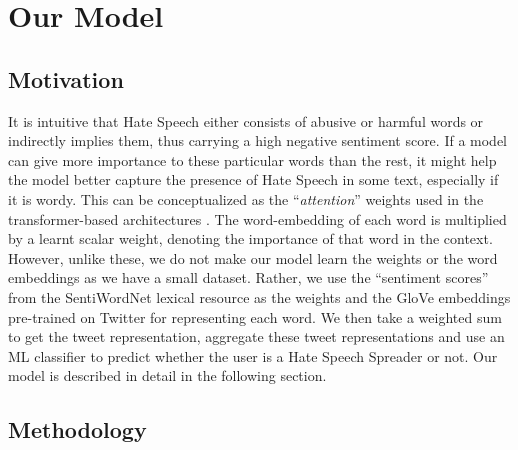 \section{Our Model}
\label{sec:models:our-model}

\subsection{Motivation}
\label{sec:models:our-model:motivation}
It is intuitive that Hate Speech either consists of abusive or harmful words or indirectly implies them, thus carrying a high negative sentiment score. If a model can give more importance to these particular words than the rest, it might help the model better capture the presence of Hate Speech in some text, especially if it is wordy. This can be conceptualized as the ``\textit{attention}''  weights used in the transformer-based architectures \cite{attention}. The word-embedding of each word is multiplied by a learnt scalar weight, denoting the importance of that word in the context. However, unlike these, we do not make our model learn the weights or the word embeddings as we have a small dataset. Rather, we use the ``sentiment scores'' from the SentiWordNet lexical resource \cite{sentiwordnet} as the weights and the \ac{GloVe} embeddings pre-trained on Twitter for representing each word. We then take a weighted sum to get the tweet representation, aggregate these tweet representations and use an ML classifier to predict whether the user is a Hate Speech Spreader or not. Our model is described in detail in the following section.

\subsection{Methodology}
\label{sec:models:our-model:methodology}

